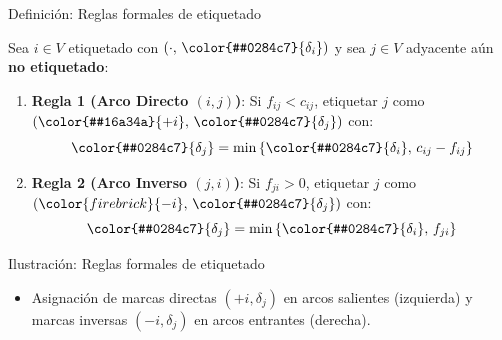 \documentclass[
  ignorenonframetext,
]{beamer}
\providecommand{\tightlist}{%
  \setlength{\itemsep}{0pt}\setlength{\parskip}{0pt}}
\begin{document}
\begin{frame}{Definición: Reglas formales de etiquetado}
\label{definiciuxf3n-reglas-formales-de-etiquetado}
\begin{tcolorbox}[enhanced jigsaw, opacityback=0, breakable, title=\textcolor{quarto-callout-note-color}{\faInfo}\hspace{0.5em}{Reglas formales de etiquetado}, colback=white, colbacktitle=quarto-callout-note-color!10!white, bottomrule=.15mm, opacitybacktitle=0.6, coltitle=black, bottomtitle=1mm, leftrule=.75mm, colframe=quarto-callout-note-color-frame, toptitle=1mm, titlerule=0mm, rightrule=.15mm, left=2mm, arc=.35mm, toprule=.15mm]

Sea \(i \in V\) etiquetado con \((\cdot, \, \color{#0284c7}{\delta_i})\)
y sea \(j \in V\) adyacente aún \textbf{no etiquetado}:

\begin{enumerate}
\item
  \textbf{Regla 1 (Arco Directo \((i, j)\))}: Si \(f_{ij} < c_{ij}\),
  etiquetar \(j\) como
  \((\color{#16a34a}{+i}, \, \color{#0284c7}{\delta_j})\) con:
  \[ \color{#0284c7}{\delta_j} = \min \left\{ \color{#0284c7}{\delta_i}, \, c_{ij} - f_{ij} \right\} \]
\item
  \textbf{Regla 2 (Arco Inverso \((j, i)\))}: Si \(f_{ji} > 0\),
  etiquetar \(j\) como
  \((\color{firebrick}{-i}, \, \color{#0284c7}{\delta_j})\) con:
  \[ \color{#0284c7}{\delta_j} = \min \left\{ \color{#0284c7}{\delta_i}, \, f_{ji} \right\} \]
\end{enumerate}

\end{tcolorbox}
\end{frame}

\begin{frame}{Ilustración: Reglas formales de etiquetado}
\label{ilustraciuxf3n-reglas-formales-de-etiquetado}
\begin{itemize}
\tightlist
\item
  Asignación de marcas directas \((+i, \delta_j)\) en arcos salientes
  (izquierda) y marcas inversas \((-i, \delta_j)\) en arcos entrantes
  (derecha).
\end{itemize}
\end{frame}
\end{document}
